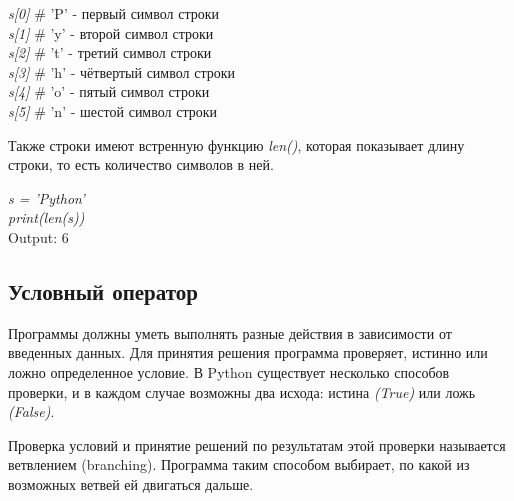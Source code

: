\begin{flushleft}
	\colorbox[rgb]{0.95, 0.95, 0.95}{\textit{s[0]} \hspace{1cm} \# 'P' - первый символ строки} \\
	\colorbox[rgb]{0.95, 0.95, 0.95}{\textit{s[1]} \hspace{1cm} \# 'y' - второй символ строки} \\
	\colorbox[rgb]{0.95, 0.95, 0.95}{\textit{s[2]} \hspace{1cm} \# 't' - третий символ строки} \\
	\colorbox[rgb]{0.95, 0.95, 0.95}{\textit{s[3]} \hspace{1cm} \# 'h' - чётвертый символ строки} \\
	\colorbox[rgb]{0.95, 0.95, 0.95}{\textit{s[4]} \hspace{1cm} \# 'o' - пятый символ строки} \\
	\colorbox[rgb]{0.95, 0.95, 0.95}{\textit{s[5]} \hspace{1cm} \# 'n' - шестой символ строки} \\
\end{flushleft}

Также строки имеют встренную функцию \colorbox[rgb]{0.95, 0.95, 0.95}{\textit{len()}}, которая показывает длину строки, то есть количество символов в ней.

\begin{flushleft}
	\colorbox[rgb]{0.95, 0.95, 0.95}{\textit{s = 'Python'}} \\
	\colorbox[rgb]{0.95, 0.95, 0.95}{\textit{print(len(s))}} \\
	\vspace{1cm}
	\colorbox[rgb]{0.95, 0.95, 0.95}{Output: 6}
\end{flushleft}

\subsection*{Условный оператор}

Программы должны уметь выполнять разные действия в зависимости от введенных данных. Для принятия решения программа проверяет, истинно или ложно определенное условие. В Python существует несколько способов проверки, и в каждом случае возможны два исхода: истина \textit{(True)} или ложь \textit{(False)}. 

Проверка условий и принятие решений по результатам этой проверки называется ветвлением (branching). Программа таким способом выбирает, по какой из возможных ветвей ей двигаться дальше.

